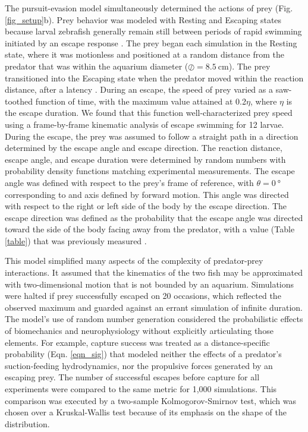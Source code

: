 \documentclass[]{rsos}%
\begin{document}
The pursuit-evasion model simultaneously determined the actions of prey (Fig. \ref{fig_setup}b).
Prey behavior was modeled with Resting and Escaping states because larval zebrafish generally remain still between periods of rapid swimming initiated by an escape response \cite{Stewart:2013bha, Stewart:2014cma}. 
The prey began each simulation in the Resting state, where it was motionless and positioned at a random distance from the predator that was within the aquarium diameter ($\oslash = \SI{8.5}{\cm}$).
The prey transitioned into the Escaping state when the predator moved within the reaction distance, after a latency \cite{Nair:2015gk}.
During an escape, the speed of prey varied as a saw-toothed function of time, with the maximum value attained at 0.2$\eta$, where $\eta$ is the escape duration. 
We found that this function well-characterized prey speed using a frame-by-frame kinematic analysis of escape swimming for 12 larvae. 
During the escape, the prey was assumed to follow a straight path in a direction determined by the escape angle and escape direction.
The reaction distance, escape angle, and escape duration were determined by random numbers with probability density functions matching experimental measurements.
The escape angle was defined with respect to the prey's frame of reference, with $\theta =  \SI{0}{\degree}$ corresponding to and axis defined by forward motion.
This angle was directed with respect to the right or left side of the body by the escape direction.
The escape direction was defined as the probability that the escape angle was directed toward the side of the body facing away from the predator, with a value (Table \ref{table}) that was previously measured \cite{Stewart:2014cma}.

This model simplified many aspects of the complexity of predator-prey interactions.
It assumed that the kinematics of the two fish may be approximated with two-dimensional motion that is not bounded by an aquarium. 
Simulations were halted if prey successfully escaped on 20 occasions, which reflected the observed maximum and guarded against an errant simulation of infinite duration.
The model's use of random number generation considered the probabilistic effects of biomechanics and neurophysiology without explicitly articulating those elements.
For example, capture success was treated as a distance-specific probability (Eqn. \ref{eqn_sig}) that modeled neither the effects of a predator's suction-feeding hydrodynamics, nor the propulsive forces generated by an escaping prey.
The number of successful escapes before capture for all experiments were compared to the same metric for 1,000 simulations.  
This comparison was executed by a two-sample Kolmogorov-Smirnov test, which was chosen over a Kruskal-Wallis test because of its emphasis on the shape of the distribution.  
\end{document}
